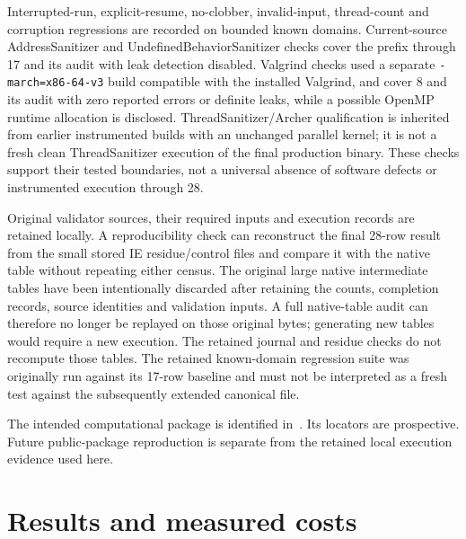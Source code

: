 \documentclass[11pt]{article}
\theoremstyle{definition}
\theoremstyle{remark}
\begin{document}
Interrupted-run, explicit-resume, no-clobber, invalid-input, thread-count
and corruption regressions are recorded on bounded known domains.
Current-source AddressSanitizer and UndefinedBehaviorSanitizer checks cover
the prefix through 17 and its audit with leak detection disabled.
Valgrind checks used a separate \texttt{-march=x86-64-v3} build compatible
with the installed Valgrind, and cover 8 and its audit with zero reported
errors or definite leaks, while a possible OpenMP runtime allocation is
disclosed. ThreadSanitizer/Archer qualification is inherited from earlier
instrumented builds with an unchanged parallel kernel; it is not a fresh
clean ThreadSanitizer execution of the final production binary.
These checks support their tested boundaries, not a universal absence of
software defects or instrumented execution through 28.

Original validator sources, their required inputs and execution records
are retained locally. A reproducibility check can reconstruct the final
28-row result from the small stored IE residue/control files and compare
it with the native table without repeating either census. The original
large native intermediate tables have been intentionally discarded after
retaining the counts, completion records, source identities and validation
inputs. A full native-table audit can therefore no longer be replayed on
those original bytes; generating new tables would require a new execution.
The retained journal and residue checks do not recompute those tables.
The retained known-domain regression suite was originally run against its
17-row baseline and must not be interpreted as a fresh test against the
subsequently extended canonical file.

The intended computational package is identified in~\cite{corti}.
Its locators are prospective. Future public-package reproduction is
separate from the retained local execution evidence used here.

\section{Results and measured costs}
\label{sec:results}
\end{document}
